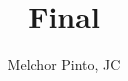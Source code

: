 \documentclass[repaso]{RDS_unit}
\title{Final}
\author{Melchor Pinto, JC}
\begin{document}
    \begin{questions}
  	

    \newpage
	

    \newpage
	

    \end{questions}
\end{document}
